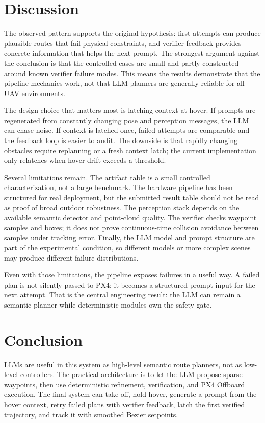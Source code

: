 \documentclass[12pt]{article}
\begin{document}
\section{Discussion}

The observed pattern supports the original hypothesis: first attempts can produce plausible routes that fail physical constraints, and verifier feedback provides concrete information that helps the next prompt. The strongest argument against the conclusion is that the controlled cases are small and partly constructed around known verifier failure modes. This means the results demonstrate that the pipeline mechanics work, not that LLM planners are generally reliable for all UAV environments.

The design choice that matters most is latching context at hover. If prompts are regenerated from constantly changing pose and perception messages, the LLM can chase noise. If context is latched once, failed attempts are comparable and the feedback loop is easier to audit. The downside is that rapidly changing obstacles require replanning or a fresh context latch; the current implementation only relatches when hover drift exceeds a threshold.

Several limitations remain. The artifact table is a small controlled characterization, not a large benchmark. The hardware pipeline has been structured for real deployment, but the submitted result table should not be read as proof of broad outdoor robustness. The perception stack depends on the available semantic detector and point-cloud quality. The verifier checks waypoint samples and boxes; it does not prove continuous-time collision avoidance between samples under tracking error. Finally, the LLM model and prompt structure are part of the experimental condition, so different models or more complex scenes may produce different failure distributions.

Even with those limitations, the pipeline exposes failures in a useful way. A failed plan is not silently passed to PX4; it becomes a structured prompt input for the next attempt. That is the central engineering result: the LLM can remain a semantic planner while deterministic modules own the safety gate.

\section{Conclusion}

LLMs are useful in this system as high-level semantic route planners, not as low-level controllers. The practical architecture is to let the LLM propose sparse waypoints, then use deterministic refinement, verification, and PX4 Offboard execution. The final system can take off, hold hover, generate a prompt from the hover context, retry failed plans with verifier feedback, latch the first verified trajectory, and track it with smoothed Bezier setpoints.
\end{document}
